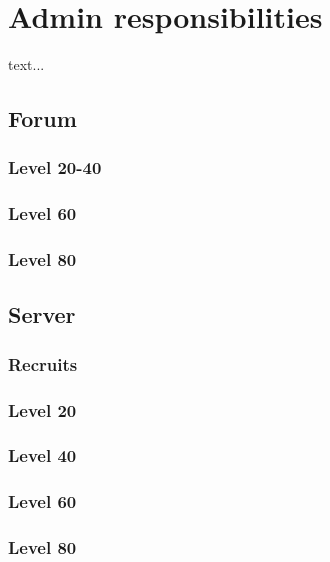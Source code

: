\chapter{Admin responsibilities}
text...

\section{Forum}
\label{responsibilities:forum}

\subsection*{Level 20-40}
\subsection*{Level 60}
\subsection*{Level 80}

\section{Server}

\subsection*{Recruits}
\subsection*{Level 20}
\subsection*{Level 40}
\subsection*{Level 60}
\subsection*{Level 80}